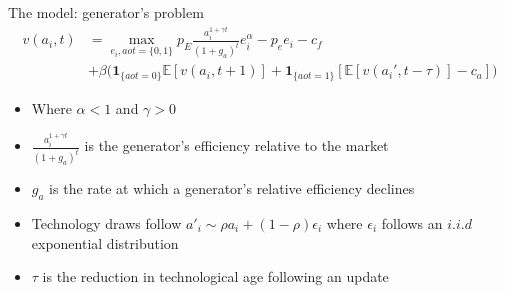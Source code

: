 \documentclass{beamer}
\begin{document}
\begin{frame}{The model: generator's problem}\label{gen_problem}
\begin{align*} 
    v(a_{i},t) &= \max_{e_i,aot=\{0,1\}} p_E\frac{a_{i}^{1+\gamma t}}{(1+g_a)^t} e_i^\alpha -p_e e_i-c_f\\ 
    &+\beta \big(\mathbf{1}_{\{aot =0\}} \mathbb{E}[v(a_{i},t+1)] + \mathbf{1}_{\{aot =1\}}[ \mathbb{E}[v(a_{i}',t-\tau)]-c_a]\big)
\end{align*}
\begin{itemize}
\item Where $\alpha<1$ and $\gamma>0$
 \item $\frac{a_{i}^{1+\gamma t}}{(1+g_a)^t}$ is the generator's efficiency relative to the market
 \item $g_a$ is the rate at which a generator's relative efficiency declines
    \item Technology draws follow $a'_i\sim \rho a_i + (1-\rho)\epsilon_i$ where $\epsilon_i$ follows an $i.i.d$ exponential distribution
     \item $\tau$ is the reduction in technological age following an update
    
\end{itemize}

 \hyperlink{intra_period}{}  
 \hyperlink{alt_model}{}   
  \hyperlink{effic_between_model}{}
  \hyperlink{rel_eff_why}{}

    
\end{frame}
\end{document}
